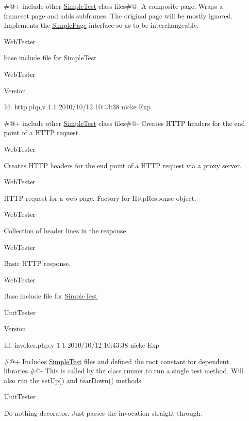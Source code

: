 \#@+ include other \hyperlink{class_simple_test}{SimpleTest} class files\#@-\/ A composite page. Wraps a frameset page and adds subframes. The original page will be mostly ignored. Implements the \hyperlink{class_simple_page}{SimplePage} interface so as to be interchangeable.

WebTester

base include file for \hyperlink{class_simple_test}{SimpleTest}

WebTester \begin{DoxyVersion}{Version}

\end{DoxyVersion}
\begin{DoxyParagraph}{Id:}
http.php,v 1.1 2010/10/12 10:43:38 nicke Exp 
\end{DoxyParagraph}


\#@+ include other \hyperlink{class_simple_test}{SimpleTest} class files\#@-\/ Creates HTTP headers for the end point of a HTTP request.

WebTester

Creates HTTP headers for the end point of a HTTP request via a proxy server.

WebTester

HTTP request for a web page. Factory for HttpResponse object.

WebTester

Collection of header lines in the response.

WebTester

Basic HTTP response.

WebTester

Base include file for \hyperlink{class_simple_test}{SimpleTest}

UnitTester \begin{DoxyVersion}{Version}

\end{DoxyVersion}
\begin{DoxyParagraph}{Id:}
invoker.php,v 1.1 2010/10/12 10:43:38 nicke Exp 
\end{DoxyParagraph}


\#@+ Includes \hyperlink{class_simple_test}{SimpleTest} files and defined the root constant for dependent libraries.\#@-\/ This is called by the class runner to run a single test method. Will also run the setUp() and tearDown() methods.

UnitTester

Do nothing decorator. Just passes the invocation straight through.

